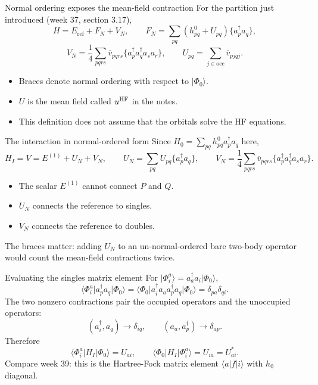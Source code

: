 \documentclass[aspectratio=169,10pt]{beamer}
\newcommand{\warnbox}[1]{%
  \begin{tcolorbox}[colback=palewarm,colframe=warm,title={\bfseries A trap to avoid}]
  #1
  \end{tcolorbox}}
\newcommand{\ket}[1]{\vert #1\rangle}
\newcommand{\mel}[3]{\langle #1\lvert #2\rvert #3\rangle}
\newcommand{\cre}[1]{a_{#1}^{\dagger}}
\newcommand{\ann}[1]{a_{#1}}
\newcommand{\no}[1]{\bigl\{#1\bigr\}}
\newcommand{\vbar}[4]{\overline v_{#1#2#3#4}}
\newcommand{\Eref}{E_{\mathrm{ref}}}
\newcommand{\ph}{\Phi_0}
\begin{document}
\begin{frame}{Normal ordering exposes the mean-field contraction}
For the partition just introduced (week 37, section 3.17),
\[
H=\Eref+F_N+V_N,
\qquad
F_N=\sum_{pq}(h^0_{pq}+U_{pq})\no{\cre{p}\ann{q}},
\]
\[
V_N=\frac14\sum_{pqrs}\vbar{p}{q}{r}{s}
\no{\cre{p}\cre{q}\ann{s}\ann{r}},
\qquad
\boxed{U_{pq}=\sum_{j\in\mathrm{occ}}\vbar{p}{j}{q}{j}.}
\]
\begin{itemize}
\item Braces denote normal ordering with respect to \(\ket{\ph}\).
\item \(U\) is the mean field called \(u^{\rm HF}\) in the notes.
\item This definition does not assume that the orbitals solve the HF equations.
\end{itemize}
\end{frame}

\begin{frame}{The interaction in normal-ordered form}
Since \(H_0=\sum_{pq}h^0_{pq}\cre{p}\ann{q}\) here,
\[
\boxed{H_I=V=E^{(1)}+U_N+V_N,}
\qquad
U_N=\sum_{pq}U_{pq}\no{\cre{p}\ann{q}},\qquad
V_N=\frac14\sum_{pqrs}\vbar{p}{q}{r}{s}
\no{\cre{p}\cre{q}\ann{s}\ann{r}}.
\]
\begin{itemize}
\item The scalar \(E^{(1)}\) cannot connect \(P\) and \(Q\).
\item \(U_N\) connects the reference to singles.
\item \(V_N\) connects the reference to doubles.
\end{itemize}
\warnbox{The braces matter: adding \(U_N\) to an un-normal-ordered bare two-body operator would count the mean-field contractions twice.}
\end{frame}

\begin{frame}{Evaluating the singles matrix element}
For \(\ket{\Phi_i^a}=\cre{a}\ann{i}\ket{\ph}\),
\[
\mel{\Phi_i^a}{\cre{p}\ann{q}}{\ph}
=\mel{\ph}{\cre{i}\ann{a}\cre{p}\ann{q}}{\ph}
=\delta_{pa}\delta_{qi}.
\]
The two nonzero contractions pair the occupied operators and the unoccupied operators:
\[
(\cre{i},\ann{q})\longrightarrow\delta_{iq},\qquad
(\ann{a},\cre{p})\longrightarrow\delta_{ap}.
\]
Therefore
\[
\boxed{\mel{\Phi_i^a}{H_I}{\ph}=U_{ai},\qquad
\mel{\ph}{H_I}{\Phi_i^a}=U_{ia}=U_{ai}^{*}.}
\]
\small Compare week 39: this is the Hartree-Fock matrix element \(\langle a|f|i\rangle\) with \(h_0\) diagonal.
\end{frame}
\end{document}

